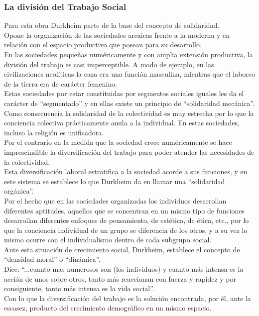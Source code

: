\subsubsection{La divisi\'on del Trabajo Social}
Para esta obra Durkheim parte de la base del concepto de solidaridad.\\
Opone la organización de las sociedades arcaicas frente a la moderna y en relación con el espacio productivo que posean para su desarrollo.\\
En las sociedades pequeñas numéricamente y con amplia extensión productiva, la división del trabajo es casi imperceptible. A modo de ejemplo, en las civilizaciones neolíticas la caza era una función masculina, mientras que el laboreo de la tierra era de carácter femenino.\\
Estas sociedades por estar constituidas por segmentos sociales iguales les da el carácter de ``segmentado'' y en ellas existe un principio de ``solidaridad mecánica''.\\
Como consecuencia la solidaridad de la colectividad es muy estrecha por lo que la conciencia colectiva prácticamente anula a la individual. En estas sociedades, incluso la religión es unificadora.\\
Por el contrario en la medida que la sociedad crece numéricamente se hace imprescindible la diversificación del trabajo para poder atender las necesidades de la colectividad.\\
Esta diversificación laboral estratifica a la sociedad acorde a sus funciones, y en este sistema se establece lo que Durkheim da en llamar una ``solidaridad orgánica''.\\
Por el hecho que en las sociedades organizadas los individuos desarrollan diferentes aptitudes, aquellos que se concentran en un mismo tipo de funciones desarrollan diferentes enfoques de pensamiento, de estética, de ética, etc., por lo que la conciencia individual de un grupo se diferencia de los otros, y a su vez lo mismo ocurre con el individualismo dentro de cada subgrupo social.\\
Ante esta situación de crecimiento social, Durkheim, establece el concepto de ``densidad moral'' o ``dinámica''.\\
Dice: ``...cuanto mas numerosos son (los individuos) y cuanto más intensa es la acción de unos sobre otros, tanto más reaccionan con fuerza y rapidez y por consiguiente, tanto más intensa es la vida social''.\\
Con lo que la diversificación del trabajo es la solución encontrada, por él, ante la escasez, producto del crecimiento demográfico en un mismo espacio.\\
